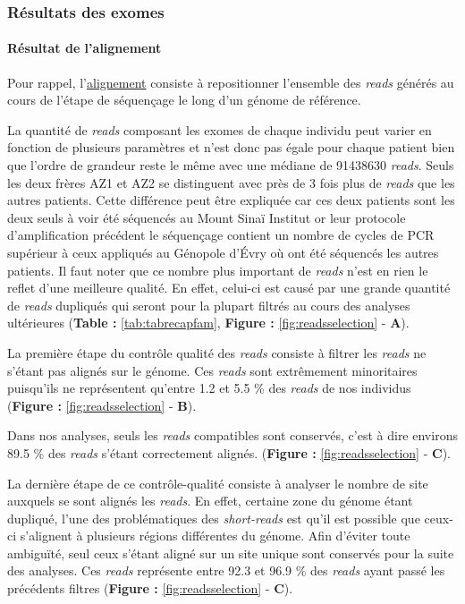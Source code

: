 \documentclass[12pt,twoside]{reedthesis}
\theoremstyle{definition}
\theoremstyle{definition}
\theoremstyle{remark}
\begin{document}
  \newpage  
  
  \subsubsection{Résultats des exomes}\label{resultats-des-exomes}
  
  \paragraph{Résultat de l'alignement}\label{resultat-de-lalignement}
  
  Pour rappel, l'\href{\%7B\#lalignement\%7D}{alignement} consiste à
  repositionner l'ensemble des \emph{reads} générés au cours de l'étape de
  séquençage le long d'un génome de référence.
  
  La quantité de \emph{reads} composant les exomes de chaque individu peut
  varier en fonction de plusieurs paramètres et n'est donc pas égale pour
  chaque patient bien que l'ordre de grandeur reste le même avec une
  médiane de 91438630 \emph{reads}. Seuls les deux frères AZ1 et AZ2 se
  distinguent avec près de 3 fois plus de \emph{reads} que les autres
  patients. Cette différence peut être expliquée car ces deux patients
  sont les deux seuls à voir été séquencés au Mount Sinaï Institut or leur
  protocole d'amplification précédent le séquençage contient un nombre de
  cycles de PCR supérieur à ceux appliqués au Génopole d'Évry où ont été
  séquencés les autres patients. Il faut noter que ce nombre plus
  important de \emph{reads} n'est en rien le reflet d'une meilleure
  qualité. En effet, celui-ci est causé par une grande quantité de
  \emph{reads} dupliqués qui seront pour la plupart filtrés au cours des
  analyses ultérieures (\textbf{Table :} \ref{tab:tabrecapfam},
  \textbf{Figure : }\ref{fig:readsselection} - \textbf{A}).
  
  La première étape du contrôle qualité des \emph{reads} consiste à
  filtrer les \emph{reads} ne s'étant pas alignés sur le génome. Ces
  \emph{reads} sont extrêmement minoritaires puisqu'ils ne représentent
  qu'entre 1.2 et 5.5 \% des \emph{reads} de nos individus (\textbf{Figure
  : }\ref{fig:readsselection} - \textbf{B}).
  
  Dans nos analyses, seuls les \emph{reads} compatibles sont conservés,
  c'est à dire environs 89.5 \% des \emph{reads} s'étant correctement
  alignés. (\textbf{Figure : }\ref{fig:readsselection} - \textbf{C}).
  
  La dernière étape de ce contrôle-qualité consiste à analyser le nombre
  de site auxquels se sont alignés les \emph{reads}. En effet, certaine
  zone du génome étant dupliqué, l'une des problématiques des
  \emph{short-reads} est qu'il est possible que ceux-ci s'alignent à
  plusieurs régions différentes du génome. Afin d'éviter toute ambiguïté,
  seul ceux s'étant aligné sur un site unique sont conservés pour la suite
  des analyses. Ces \emph{reads} représente entre 92.3 et 96.9 \% des
  \emph{reads} ayant passé les précédents filtres (\textbf{Figure :
  }\ref{fig:readsselection} - \textbf{C}).
  
\end{document}
